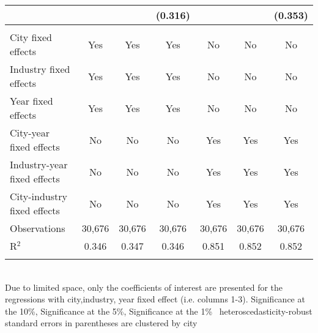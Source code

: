 \documentclass[12pt]{article}
\begin{document}
\begin{table}[!htbp]
\begin{adjustbox}{width=\textwidth, totalheight=\baselineskip,keepaspectratio}
\begin{tabular}{@{\extracolsep{5pt}}lcccccc}
  &  &  & (0.316) &  &  & (0.353) \\ 
 \hline \\[-1.8ex] 
City fixed effects & Yes & Yes & Yes & No & No & No \\ 
Industry fixed effects & Yes & Yes & Yes & No & No & No \\ 
Year fixed effects & Yes & Yes & Yes & No & No & No \\ 
City-year fixed effects & No & No & No & Yes & Yes & Yes \\ 
Industry-year fixed effects & No & No & No & Yes & Yes & Yes \\ 
City-industry fixed effects & No & No & No & Yes & Yes & Yes \\ 
Observations & 30,676 & 30,676 & 30,676 & 30,676 & 30,676 & 30,676 \\ 
R$^{2}$ & 0.346 & 0.347 & 0.346 & 0.851 & 0.852 & 0.852 \\ 
\hline 
\hline \\[-1.8ex] 
\end{tabular}
\end{adjustbox}
\begin{tablenotes} 
 \small 
 \item \\ 
\footnotesize{
Due to limited space, only the coefficients of interest are presented 
for the regressions with city,industry, year fixed effect (i.e. columns 1-3).
\sym{*} Significance at the 10\%, \sym{**} Significance at the 5\%, \sym{***} Significance at the 1\% \
heteroscedasticity-robust standard errors in parentheses are clustered by city 
}
 
\end{tablenotes}
\end{table}
\end{document}
